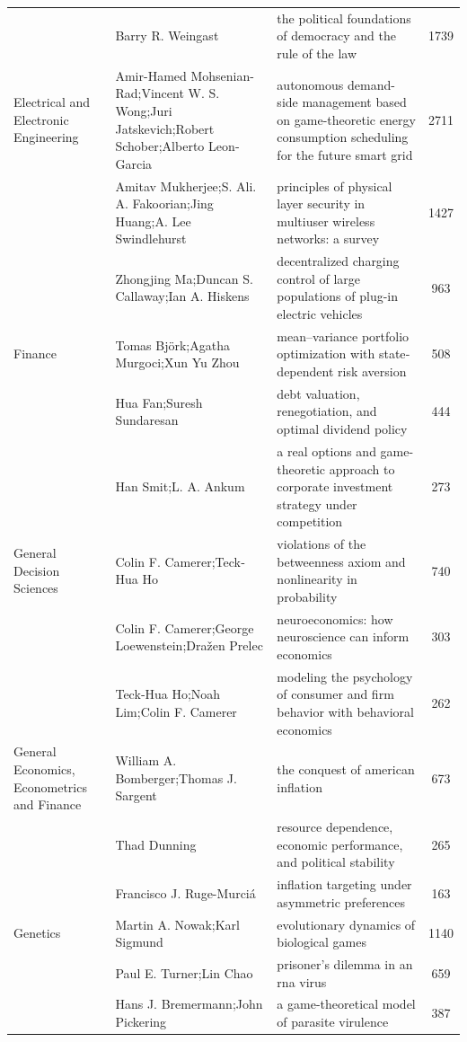 \documentclass[
  12pt,
]{article}
\begin{document}
\begin{longtable}[t]{|>{\raggedright\arraybackslash}p{4cm}>{\raggedright\arraybackslash}p{4cm}>{\raggedright\arraybackslash}p{4cm}>{}c|}
 & Barry R. Weingast & the political foundations of democracy and the rule of the law & 1739\\
Electrical and Electronic Engineering & Amir-Hamed Mohsenian-Rad;Vincent W. S. Wong;Juri Jatskevich;Robert Schober;Alberto Leon‐Garcia & autonomous demand-side management based on game-theoretic energy consumption scheduling for the future smart grid & 2711\\
 & Amitav Mukherjee;S. Ali. A. Fakoorian;Jing Huang;A. Lee Swindlehurst & principles of physical layer security in multiuser wireless networks: a survey & 1427\\
 & Zhongjing Ma;Duncan S. Callaway;Ian A. Hiskens & decentralized charging control of large populations of plug-in electric vehicles & 963\\
Finance & Tomas Björk;Agatha Murgoci;Xun Yu Zhou & mean–variance portfolio optimization with state‐dependent risk aversion & 508\\
 & Hua Fan;Suresh Sundaresan & debt valuation, renegotiation, and optimal dividend policy & 444\\
 & Han Smit;L. A. Ankum & a real options and game-theoretic approach to corporate investment strategy under competition & 273\\
General Decision Sciences & Colin F. Camerer;Teck‐Hua Ho & violations of the betweenness axiom and nonlinearity in probability & 740\\
 & Colin F. Camerer;George Loewenstein;Dražen Prelec & neuroeconomics: how neuroscience can inform economics & 303\\
 & Teck‐Hua Ho;Noah Lim;Colin F. Camerer & modeling the psychology of consumer and firm behavior with behavioral economics & 262\\
General Economics, Econometrics and Finance & William A. Bomberger;Thomas J. Sargent & the conquest of american inflation & 673\\
 & Thad Dunning & resource dependence, economic performance, and political stability & 265\\
 & Francisco J. Ruge-Murciá & inflation targeting under asymmetric preferences & 163\\
Genetics & Martin A. Nowak;Karl Sigmund & evolutionary dynamics of biological games & 1140\\
 & Paul E. Turner;Lin Chao & prisoner's dilemma in an rna virus & 659\\
 & Hans J. Bremermann;John Pickering & a game-theoretical model of parasite virulence & 387\\

\end{longtable}
\end{document}
